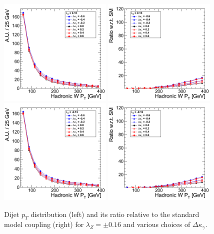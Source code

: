\begin{figure}[h!t]
  {\centering
    \includegraphics[width=0.48\textwidth]{figs/HadronicWpT_016.png}
    \includegraphics[width=0.48\textwidth]{figs/HadronicWpT_016_ratio.png}
    \includegraphics[width=0.48\textwidth]{figs/HadronicWpT_m016.png}
    \includegraphics[width=0.48\textwidth]{figs/HadronicWpT_m016_ratio.png}
    \caption{Dijet $p_T$ distribution (left) and its ratio relative to 
    the standard model coupling (right) for $\lambda_Z = \pm 0.16$ and various choices of $\Delta{\kappa_\gamma}$.}
    \label{fig:ww_dijetPt_atgcRatio016}}
\end{figure}
